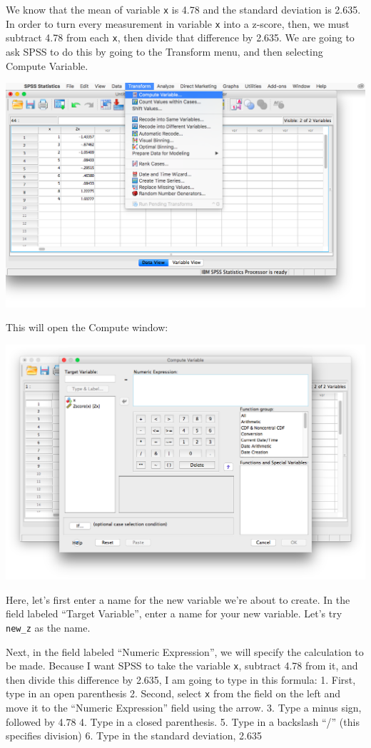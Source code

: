 \documentclass[
]{book}
\begin{document}
We know that the mean of variable \texttt{x} is 4.78 and the standard deviation is 2.635. In order to turn every measurement in variable \texttt{x} into a z-score, then, we must subtract 4.78 from each \texttt{x}, then divide that difference by 2.635. We are going to ask SPSS to do this by going to the {Transform} menu, and then selecting {Compute Variable}.

\includegraphics{img/4.4.16.png}

This will open the Compute window:

\includegraphics{img/4.4.17.png}

Here, let's first enter a name for the new variable we're about to create. In the field labeled ``Target Variable'', enter a name for your new variable. Let's try \texttt{new\_z} as the name.

Next, in the field labeled ``Numeric Expression'', we will specify the calculation to be made. Because I want SPSS to take the variable \texttt{x}, subtract 4.78 from it, and then divide this difference by 2.635, I am going to type in this formula:
1. First, type in an open parenthesis
2. Second, select \texttt{x} from the field on the left and move it to the ``Numeric Expression'' field using the arrow.
3. Type a minus sign, followed by 4.78
4. Type in a closed parenthesis.
5. Type in a backslash ``/'' (this specifies division)
6. Type in the standard deviation, 2.635
\end{document}
